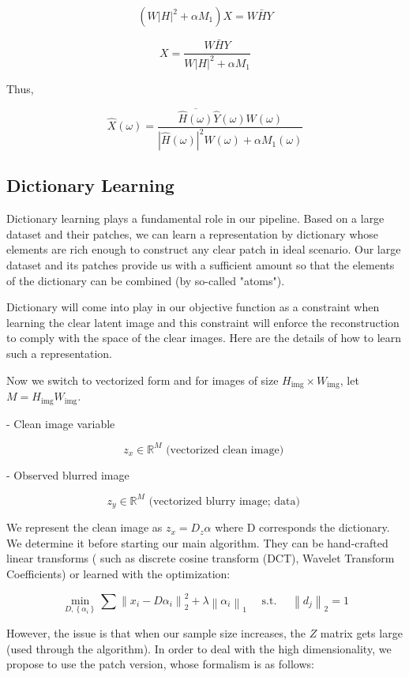 \documentclass{article}
\theoremstyle{definition}
\begin{document}
$$
\left(W|H|^2+\alpha M_1\right) X=W \bar{H} Y
$$ 


$$
X=\frac{W \bar{H} Y}{W|H|^2+\alpha M_1}
$$


Thus, 

$$
\widehat{X}(\omega)=\frac{\overline{\widehat{H}(\omega)} \widehat{Y}(\omega) W(\omega)}{|\widehat{H}(\omega)|^2 W(\omega)+\alpha M_1(\omega)}
$$





\subsection{Dictionary Learning}


Dictionary learning plays a fundamental role in our pipeline. Based on a large dataset and their patches, we can learn a representation by dictionary whose elements are rich enough to construct any clear patch in ideal scenario. Our large dataset and its patches provide us with a sufficient amount so that the elements of the dictionary can be combined (by so-called "atoms"). 

Dictionary will come into play in our objective function as a constraint when learning the clear latent image and this constraint will enforce the reconstruction to comply with the space of the clear images. Here are the details of how to learn such a representation.


Now we switch to vectorized form and for images of size $H_{\mathrm{img}} \times W_{\mathrm{img}}$, let $M=H_{\mathrm{img}} W_{\mathrm{img}}$. 

- Clean image variable

$$
z_x \in \mathbb{R}^M \text { (vectorized clean image) }
$$

- Observed blurred image

$$
z_y \in \mathbb{R}^M \text { (vectorized blurry image; data) }
$$


We represent the clean image as $z_x=D_z \alpha$ where D corresponds the dictionary. We determine it before starting our main algorithm. They can be hand-crafted linear transforms ( such as discrete cosine transform (DCT), Wavelet Transform Coefficients) or learned with the optimization:

$$
\min _{D,\left\{\alpha_i\right\}} \sum\left\|x_i-D \alpha_i\right\|_2^2+\lambda\left\|\alpha_i\right\|_1 \quad \text { s.t. } \quad\left\|d_j\right\|_2=1
$$

However, the issue is that when our sample size increases, the $Z $ matrix gets large (used through the algorithm). In order to deal with the high dimensionality, we propose to use the patch version, whose formalism is as follows:
\end{document}
